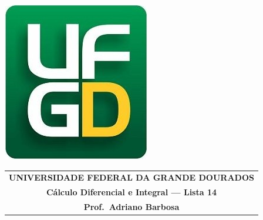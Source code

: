 \documentclass[a4paper,5pt]{amsbook}
\begin{document}
\thispagestyle{empty}
\pagestyle{empty}
\begin{minipage}[h]{0.14\textwidth}
	\includegraphics[scale=0.24]{../ufgd.png}
\end{minipage}
\begin{minipage}[h]{\textwidth}
\begin{tabular}{c}
{{\bf UNIVERSIDADE FEDERAL DA GRANDE DOURADOS}}\\
{{\bf C\'alculo Diferencial e Integral --- Lista 14}}\\
{{\bf Prof.\ Adriano Barbosa}}\\
\end{tabular}
\vspace{-0.45cm}
%
\end{minipage}

\end{document}
